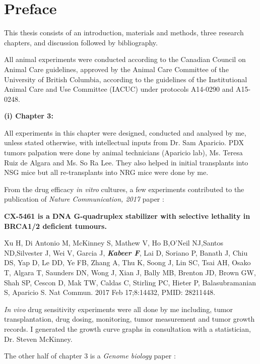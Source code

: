 
\chapter{Preface}
This thesis consists of an introduction, materials and methods, three research chapters, and discussion followed by bibliography.

All animal experiments were conducted according to the Canadian Council on Animal Care guidelines, approved by the Animal Care Committee of the University of British Columbia, according to the guidelines of the Institutional Animal Care and Use Committee (IACUC) under protocols A14-0290 and A15-0248.
  
  \textbf{(i) Chapter 3:}

All experiments in this chapter were designed, conducted and analysed by me, unless stated otherwise, with intellectual inputs from Dr. Sam Aparicio. PDX tumors palpation were done by animal technicians (Aparicio lab), Ms. Teresa Ruiz de Algara and Ms. So Ra Lee. They also helped in initial transplants into \ac{NSG} mice but all re-transplants into \ac{NRG} mice were done by me. 


From the drug efficacy \textit{in vitro} cultures, a few experiments contributed to the publication of \textit{Nature Communication, 2017} paper \cite{xu2017cx}:

\textbf{CX-5461 is a DNA G-quadruplex stabilizer with selective lethality in BRCA1/2 deficient tumours.}

Xu H, Di Antonio M, McKinney S, Mathew V, Ho B,O'Neil NJ,Santos ND,Silvester J, Wei V, Garcia J, \emph{\textbf{Kabeer F}}, Lai D, Soriano P, Banath J, Chiu DS, Yap D, Le DD, Ye FB, Zhang A, Thu K, Soong J, Lin SC, Tsai AH, Osako T, Algara T, Saunders DN, Wong J, Xian J, Bally MB, Brenton JD, Brown GW, Shah SP, Cescon D, Mak TW, Caldas C, Stirling PC, Hieter P, Balasubramanian S, Aparicio S. Nat Commun. 2017 Feb 17;8:14432, PMID: 28211448.



 \textit{In vivo} drug sensitivity experiments were all done by me including, tumor transplantation, drug dosing, monitoring, tumor measurement and tumor growth records. I generated the growth curve graphs in consultation with a statistician, Dr. Steven McKinney.


The other half of chapter 3 is a \textit{Genome biology} paper \cite{o2019dissociation}:


